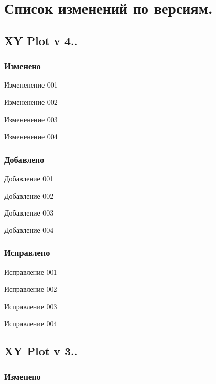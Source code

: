 \hypertarget{page1_secVersions}{}\section{Список изменений по версиям.}\label{page1_secVersions}
\hypertarget{page1_subsecV441}{}\subsection{X\-Y Plot v 4..}\label{page1_subsecV441}
\hypertarget{page1_ssubV241Changes}{}\subsubsection{Изменено}\label{page1_ssubV241Changes}
\begin{DoxyItemize}
\item Измененение 001 \item Измененение 002 \item Измененение 003 \item Измененение 004 \end{DoxyItemize}
\hypertarget{page1_ssubV441Add}{}\subsubsection{Добавлено}\label{page1_ssubV441Add}
\begin{DoxyItemize}
\item Добавление 001 \item Добавление 002 \item Добавление 003 \item Добавление 004 \end{DoxyItemize}
\hypertarget{page1_ssubV441Fixed}{}\subsubsection{Исправлено}\label{page1_ssubV441Fixed}
\begin{DoxyItemize}
\item Исправление 001 \item Исправление 002 \item Исправление 003 \item Исправление 004 \end{DoxyItemize}
\hypertarget{page1_subsecV341}{}\subsection{X\-Y Plot v 3..}\label{page1_subsecV341}
\hypertarget{page1_ssubV341Changes}{}\subsubsection{Изменено}\label{page1_ssubV341Changes}

